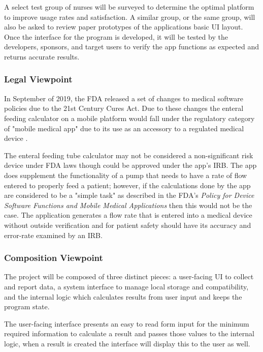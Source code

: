 \documentclass[onecolumn, draftclsnofoot,10pt, compsoc]{IEEEtran}
\begin{document}
A select test group of nurses will be surveyed to determine the optimal platform to improve usage rates and satisfaction.
A similar group, or the same group, will also be asked to review paper prototypes of the applications basic UI layout.
Once the interface for the program is developed, it will be tested by the developers, sponsors, and target users to verify the app functions as expected and returns accurate results.


\subsubsection{Legal Viewpoint}
In September of 2019, the FDA released a set of changes to medical software policies due to the 21st Century Cures Act.
Due to these changes the enteral feeding calculator on a mobile platform would fall under the regulatory category of "mobile medical app" due to its use as an accessory to a regulated medical device \autocite{FDA}.

The enteral feeding tube calculator may not be considered a non-significant risk device under FDA laws though could be approved under the app's IRB.
The app does supplement the functionality of a pump that needs to have a rate of flow entered to properly feed a patient; however, if the calculations done by the app are considered to be a "simple task" as described in the FDA's \textit{Policy for Device Software Functions and Mobile Medical Applications} then this would not be the case.
The application generates a flow rate that is entered into a medical device without outside verification and for patient safety should have its accuracy and error-rate examined by an IRB.

\subsubsection{Composition Viewpoint}
The project will be composed of three distinct pieces: a user-facing UI to collect and report data, a system interface to manage local storage and compatibility, and the internal logic which calculates results from user input and keeps the program state.

The user-facing interface presents an easy to read form input for the minimum required information to calculate a result and passes those values to the internal logic, when a result is created the interface will display this to the user as well.
\end{document}
